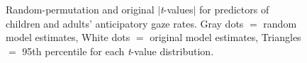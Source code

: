 \documentclass[authoryear, 12pt]{elsarticle}
\begin{document}
\begin{figure}[h!]
  \centering
  \hfill
  \caption{Random-permutation and original $|$\textit{t}-values$|$ for predictors of children and adults' anticipatory gaze rates. Gray dots $=$ random model estimates, White dots $=$ original model estimates, Triangles $=$ 95th percentile for each \textit{t}-value distribution.}
\end{figure}

\end{document}
